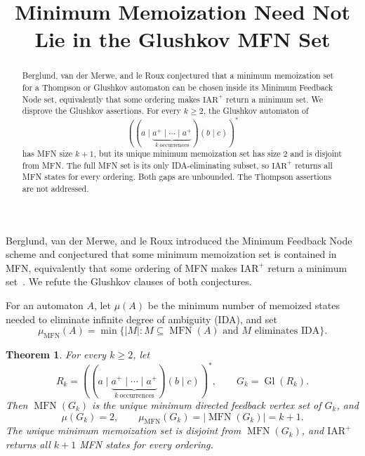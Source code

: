 \documentclass[11pt]{amsart}
\title[Memoization outside the Glushkov MFN set]
{Minimum Memoization Need Not Lie in the Glushkov MFN Set}
\date{}
\newtheorem{theorem}{Theorem}
\newcommand{\Gl}{\operatorname{Gl}}
\newcommand{\MFN}{\operatorname{MFN}}
\begin{document}
\begin{abstract}
Berglund, van der Merwe, and le Roux conjectured that a minimum
memoization set for a Thompson or Glushkov automaton can be chosen
inside its Minimum Feedback Node set, equivalently that some ordering
makes $\mathrm{IAR}^{+}$ return a minimum set.  We disprove the
Glushkov assertions.  For every $k\geq2$, the Glushkov automaton of
\[
 \left(\left(a\mid
 \underbrace{a^{+}\mid\cdots\mid a^{+}}_{k\ \mathrm{occurrences}}
 \right)(b\mid c)\right)^{*}
\]
has MFN size $k+1$, but its unique minimum memoization set has size $2$
and is disjoint from MFN.  The full MFN set is its only IDA-eliminating
subset, so $\mathrm{IAR}^{+}$ returns all MFN states for every ordering.
Both gaps are unbounded.  The Thompson assertions are not addressed.
\end{abstract}

\maketitle

Berglund, van der Merwe, and le Roux introduced the Minimum Feedback
Node scheme and conjectured that some minimum memoization set is
contained in MFN, equivalently that some ordering of MFN makes
$\mathrm{IAR}^{+}$ return a minimum set~\cite[Conjectures~1 and~2]{Berglund2026}.
We refute the Glushkov clauses of both conjectures.

For an automaton $A$, let $\mu(A)$ be the minimum number of memoized
states needed to eliminate infinite degree of ambiguity (IDA), and set
\[
 \mu_{\mathrm{MFN}}(A)=
 \min\bigl\{|M|:M\subseteq\MFN(A)\text{ and }M\text{ eliminates IDA}\bigr\}.
\]

\begin{theorem}\label{thm:main}
For every $k\geq2$, let
\[
 R_k=\left(\left(a\mid
 \underbrace{a^{+}\mid\cdots\mid a^{+}}_{k\ \mathrm{occurrences}}
 \right)(b\mid c)\right)^{*},
 \qquad G_k=\Gl(R_k).
\]
Then $\MFN(G_k)$ is the unique minimum directed feedback vertex set of
$G_k$, and
\[
 \mu(G_k)=2,
 \qquad
 \mu_{\mathrm{MFN}}(G_k)=|\MFN(G_k)|=k+1.
\]
The unique minimum memoization set is disjoint from $\MFN(G_k)$, and
$\mathrm{IAR}^{+}$ returns all $k+1$ MFN states for every ordering.
\end{theorem}
\end{document}

